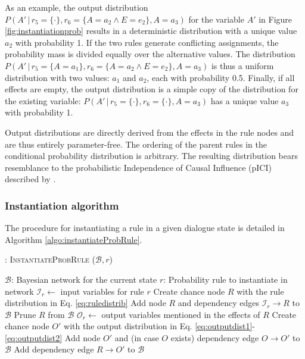 As an example, the output distribution $P(A' \, | \, r_5\!=\!\{\cdot\},r_6\!=\!\{A\!=\!a_2 \land E\!=\!e_2\}, A\!=\!a_3)$ for the variable $A'$ in Figure \ref{fig:instantiationprob} results in a deterministic distribution with a unique value $a_2$ with probability 1.  If the two rules generate conflicting assignments, the probability mass is divided equally over the alternative values. The distribution $P(A' \, | \, r_5\!=\!\{A\!=\!a_1\},r_6\!=\!\{A\!=\!a_2 \land E\!=\!e_2\}, A\!=\!a_3)$ is thus a uniform distribution with two values: $a_1$ and $a_2$, each with probability 0.5. Finally, if all effects are empty, the output distribution is a simple copy of the distribution for the existing variable: $P(A' \, | \, r_5\!=\!\{\cdot\},r_6\!=\!\{\cdot\}, A\!=\!a_3)$ has a unique value $a_3$ with probability 1. 

Output distributions are directly derived from the effects in the rule nodes and are thus entirely parameter-free.  The ordering of the parent rules in the conditional probability distribution is arbitrary. The resulting distribution bears resemblance to the probabilistic Independence of Causal Influence (pICI) described by \cite{diez06}. 


\subsubsection*{Instantiation algorithm} 
\label{sec:utilruleinstantiation}

The procedure for instantiating a rule in a given dialogue state is detailed in Algorithm \ref{algo:instantiateProbRule}. 

\begin{algorithm}[h!]
\caption{: \textsc{InstantiateProbRule} ($\mathcal{B}, r$)}
\begin{algorithmic}[1] \vspace{1mm}
\REQUIRE $\mathcal{B}$: Bayesian network for the current state
\REQUIRE $r$: Probability rule to instantiate in network  \vspace{1mm}
\STATE $\mathcal{I}_{r} \leftarrow$ input variables for rule $r$
\STATE Create chance node $R$ with the rule distribution in Eq. \eqref{eq:ruledistrib}
\STATE Add node $R$ and dependency edges $\mathcal{I}_{r} \rightarrow R$ to $\mathcal{B}$ 
\STATE Prune $R$ from $\mathcal{B}$
\ELSE
\STATE $\mathcal{O}_{r} \leftarrow$ output variables mentioned in the effects of $R$
\STATE Create chance node $O'$ with the output distribution in Eq. \eqref{eq:outputdist1}-\eqref{eq:outputdist2}
\STATE Add node $O'$ and (in case $O$ exists) dependency edge $O \rightarrow O'$ to $\mathcal{B}$
\ENDIF
\STATE Add dependency edge $R \rightarrow O'$ to $\mathcal{B}$ 
\ENDFOR
\ENDIF
\end{algorithmic}
\label{algo:instantiateProbRule}
\end{algorithm}

